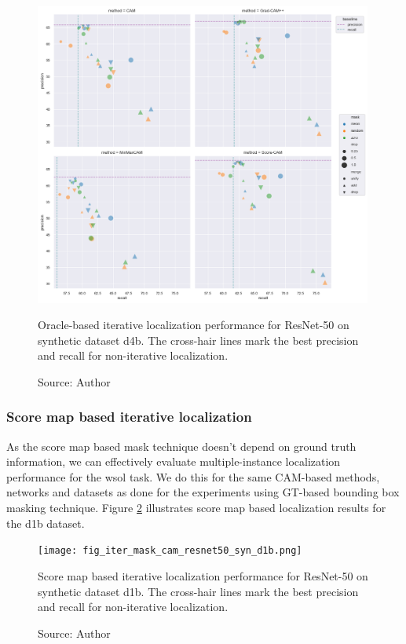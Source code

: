 \begin{figure}[h]
    \begin{center}       
    \includegraphics[width=0.99\textwidth]{images/fig_iter_resnet50_syn_d4b.png}
    \caption[Oracle-based iterative localization performance for ResNet-50 on synthetic dataset d4b]{Oracle-based iterative localization performance for ResNet-50 on synthetic dataset d4b. The cross-hair lines mark the best precision and recall for non-iterative localization.}
    \caption*{Source: Author}
    \label{fig:prec_iter_resnet50_syn_d4b}
    \end{center}
\end{figure}

\subsubsection{Score map based iterative localization}

As the score map based mask technique doesn't depend on ground truth information, we can effectively evaluate multiple-instance localization performance for the \acrshort{wsol} task. We do this for the same CAM-based methods, networks and datasets as done for the experiments using GT-based bounding box masking technique. Figure \ref{fig:prec_iter_mask_cam_resnet50_syn_d1b} illustrates score map based localization results for the d1b dataset.

\begin{figure}[h]
    \begin{center}       
    \texttt{[image: fig\_iter\_mask\_cam\_resnet50\_syn\_d1b.png]}
    \caption[Score map based iterative localization performance for ResNet-50 on synthetic dataset d1b]{Score map based iterative localization performance for ResNet-50 on synthetic dataset d1b. The cross-hair lines mark the best precision and recall for non-iterative localization.}
    \caption*{Source: Author}
    \label{fig:prec_iter_mask_cam_resnet50_syn_d1b}
    \end{center}
\end{figure}

